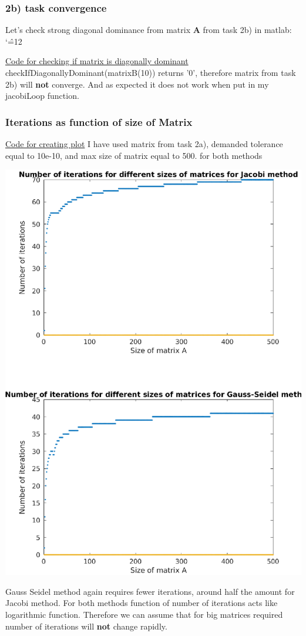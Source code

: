 \documentclass[12pt]{report}
\newenvironment{simplechar}{%
   \catcode`\^=12
}{}
\begin{document}
\subsubsection{2b) task convergence }
Let's check strong diagonal dominance from matrix \textbf{A} from task 2b) in matlab:
\begin{simplechar}

\hyperlink{function_3_dominant}{Code for checking if matrix is diagonally dominant}
\\

checkIfDiagonallyDominant(matrixB(10)) returns '0', therefore matrix from task 2b) will \textbf{not} converge. And as expected it does not work when put in my jacobiLoop function.
\subsubsection{Iterations as function of size of Matrix}
\hyperlink{function_3_plot}{Code for creating plot}
I have used matrix from task 2a), demanded tolerance equal to 10e-10, and max size of matrix equal to 500. for both methods
\begin{center}
   \includegraphics[scale=0.75]{iterations.eps}
\end{center}
Gauss Seidel method again requires fewer iterations, around half the amount for Jacobi method. For both methods function of number of iterations acts like logarithmic function. Therefore we can assume that for big matrices required number of iterations will \textbf{not} change rapidly.


\end{simplechar}
\end{document}
